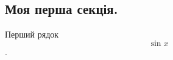 \documentclass[a4paper,12pt]{article}
\begin{document}
\begin{large}

\section*{Моя перша секція.}

Перший рядок $$\sin{x}$$.

\end{large}
\end{document}

